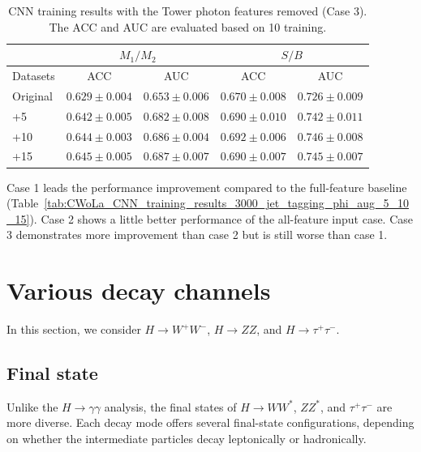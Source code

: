\documentclass[12pt]{article}
\begin{document}
    \begin{table}[htpb]
        \centering
        \caption{CNN training results with the Tower photon features removed (Case 3). The ACC and AUC are evaluated based on 10 training.}
        \label{tab:CWoLa_CNN_training_results_3000_jet_tagging_eta_phi_aug_5_10_15_remove_photon_case3}
        \begin{tabular}{l|cc|cc}
                     & \multicolumn{2}{c|}{$M_1 / M_2$}      & \multicolumn{2}{c}{$S / B$}           \\ \hline
            Datasets & ACC               & AUC               & ACC               & AUC               \\ \hline
            Original & $0.629 \pm 0.004$ & $0.653 \pm 0.006$ & $0.670 \pm 0.008$ & $0.726 \pm 0.009$ \\
            +5       & $0.642 \pm 0.005$ & $0.682 \pm 0.008$ & $0.690 \pm 0.010$ & $0.742 \pm 0.011$ \\
            +10      & $0.644 \pm 0.003$ & $0.686 \pm 0.004$ & $0.692 \pm 0.006$ & $0.746 \pm 0.008$ \\
            +15      & $0.645 \pm 0.005$ & $0.687 \pm 0.007$ & $0.690 \pm 0.007$ & $0.745 \pm 0.007$
        \end{tabular}
    \end{table}

    Case 1 leads the performance improvement compared to the full-feature baseline (Table~\ref{tab:CWoLa_CNN_training_results_3000_jet_tagging_phi_aug_5_10_15}). Case 2 shows a little better performance of the all-feature input case. Case 3 demonstrates more improvement than case 2 but is still worse than case 1.

    
\section{Various decay channels}%
\label{sec:various_decay_channels}
    In this section, we consider $H \to W^+W^-$, $H \to ZZ$, and $H \to \tau^+ \tau^-$.

    \subsection{Final state}%
    \label{sub:final_state}

        Unlike the $ H\to\gamma\gamma$ analysis, the final states of $H \to WW^*$, $ZZ^*$, and $\tau^+\tau^-$ are more diverse. Each decay mode offers several final-state configurations, depending on whether the intermediate particles decay leptonically or hadronically.
\end{document}
